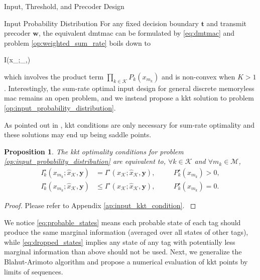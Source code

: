 \documentclass[journal]{IEEEtran}
\newtheorem{proposition}{Proposition}
\begin{document}
\begin{section}{Input, Threshold, and Precoder Design}
	\begin{subsection}{Input Probability Distribution}
		For any fixed decision boundary $\boldsymbol{t}$ and transmit precoder $\boldsymbol{w}$, the equivalent \gls{dmtmac} can be formulated by \eqref{eq:dmtmac} and problem \eqref{op:weighted_sum_rate} boils down to
		\begin{maxi!}
			{}{I(x_{};_{},)}{\label{op:input_probability_distribution}}{}
			\addConstraint{\eqref{co:sum_probability},\eqref{co:nonnegative_probability},}
		\end{maxi!}
		which involves the product term $\prod_{k \in \mathcal{K}} P_k(x_{m_k})$ and is non-convex when $K > 1$.
		Interestingly, the sum-rate optimal input design for general discrete memoryless \gls{mac} remains an open problem, and we instead propose a \gls{kkt} solution to problem \eqref{op:input_probability_distribution}.
		\begin{footnote}
			As pointed out in \cite{Buhler2011}, \gls{kkt} conditions are only necessary for sum-rate optimality and these solutions may end up being saddle points.
		\end{footnote}
		\begin{proposition}
			The \gls{kkt} optimality conditions for problem \eqref{op:input_probability_distribution} are equivalent to, $\forall k \in \mathcal{K}$ and $\forall m_k \in \mathcal{M}$,
			\begin{subequations}
				\label{eq:input_kkt_condition}
				\begin{alignat}{2}
					I_k^\star(x_{m_k};\hat{x}_{\mathcal{K}},\boldsymbol{y}) & = I^\star(x_{\mathcal{K}};\hat{x}_{\mathcal{K}},\boldsymbol{y}), \quad   &  & P_k^\star(x_{m_k}) > 0,\label{eq:probable_states} \\
					I_k^\star(x_{m_k};\hat{x}_{\mathcal{K}},\boldsymbol{y}) & \le I^\star(x_{\mathcal{K}};\hat{x}_{\mathcal{K}},\boldsymbol{y}), \quad &  & P_k^\star(x_{m_k}) = 0.\label{eq:dropped_states}
				\end{alignat}
			\end{subequations}
			\label{pr:input_kkt_condition}
		\end{proposition}

		\begin{proof}
			Please refer to Appendix \ref{ap:input_kkt_condition}.
			\label{pf:input_kkt_condition}
		\end{proof}

		We notice \eqref{eq:probable_states} means each probable state of each tag should produce the same marginal information (averaged over all states of other tags), while \eqref{eq:dropped_states} implies any state of any tag with potentially less marginal information than above should not be used.
		Next, we generalize the Blahut-Arimoto algorithm \cite{Arimoto1972,Blahut1972a} and propose a numerical evaluation of \gls{kkt} points by limits of sequences.


\end{subsection}
\end{section}
\end{document}
